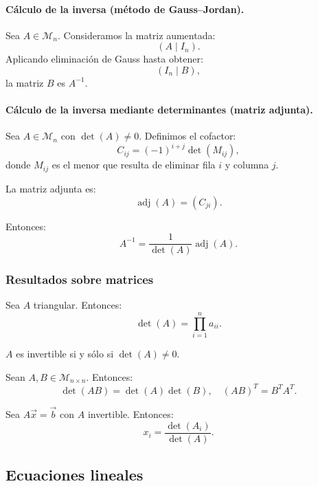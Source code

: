 \documentclass[10pt]{article}
\begin{document}
\paragraph{Cálculo de la inversa (método de Gauss–Jordan).}

Sea $ A \in \mathcal{M}_n $. Consideramos la matriz aumentada:
\[
(A \mid I_n).
\]
Aplicando eliminación de Gauss hasta obtener:
\[
(I_n \mid B),
\]
la matriz $ B $ es $ A^{-1} $.

\paragraph{Cálculo de la inversa mediante determinantes (matriz adjunta).}

Sea $ A \in \mathcal{M}_n $ con $\det(A)\neq 0$. Definimos el cofactor:
\[
C_{ij} = (-1)^{i+j} \det(M_{ij}),
\]
donde $ M_{ij} $ es el menor que resulta de eliminar fila $i$ y columna $j$.

La matriz adjunta es:
\[
\operatorname{adj}(A) = (C_{ji}).
\]

Entonces:
\[
A^{-1} = \frac{1}{\det(A)} \operatorname{adj}(A).
\]

\subsubsection{Resultados sobre matrices}

\begin{theorem}
  Sea $A$ triangular. Entonces:
  \[
  \det(A) = \prod_{i=1}^n a_{ii}.
  \]
\end{theorem}

\begin{theorem}
  $A$ es invertible si y sólo si $\det(A) \neq 0$.
\end{theorem}

\begin{theorem}
  Sean $A,B \in \mathcal{M}_{n \times n}$. Entonces:
  \[
  \det(AB) = \det(A)\det(B), 
  \quad
  (AB)^T = B^T A^T.
  \]
\end{theorem}

\begin{theorem}
  Sea $A\vec{x} = \vec{b}$ con $A$ invertible. Entonces:
  \[
  x_i = \frac{\det(A_i)}{\det(A)}.
  \]
\end{theorem}

\subsection{Ecuaciones lineales}
\end{document}
